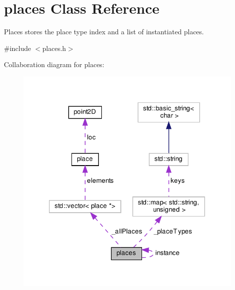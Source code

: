 \hypertarget{classplaces}{}\section{places Class Reference}
\label{classplaces}


Places stores the place type index and a list of instantiated places.  




{\ttfamily \#include $<$places.\+h$>$}



Collaboration diagram for places\+:\nopagebreak
\begin{figure}[H]
\begin{center}
\leavevmode
\includegraphics[width=320pt]{classplaces__coll__graph}
\end{center}
\end{figure}

